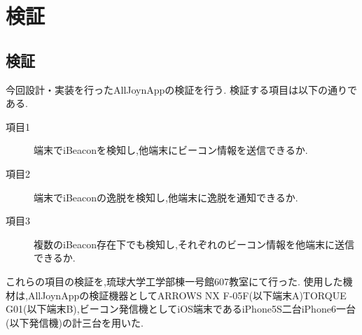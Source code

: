 \chapter{検証}

\section{検証}
今回設計・実装を行ったAllJoynAppの検証を行う.
検証する項目は以下の通りである.

\begin{description}
\item[項目1] 端末でiBeaconを検知し,他端末にビーコン情報を送信できるか.
\item[項目2] 端末でiBeaconの逸脱を検知し,他端末に逸脱を通知できるか.
\item[項目3] 複数のiBeacon存在下でも検知し,それぞれのビーコン情報を他端末に送信できるか.
\end{description}

これらの項目の検証を,琉球大学工学部棟一号館607教室にて行った.
使用した機材は,AllJoynAppの検証機器としてARROWS NX F-05F(以下端末A)TORQUE G01(以下端末B),ビーコン発信機としてiOS端末であるiPhone5S二台iPhone6一台(以下発信機)の計三台を用いた.


